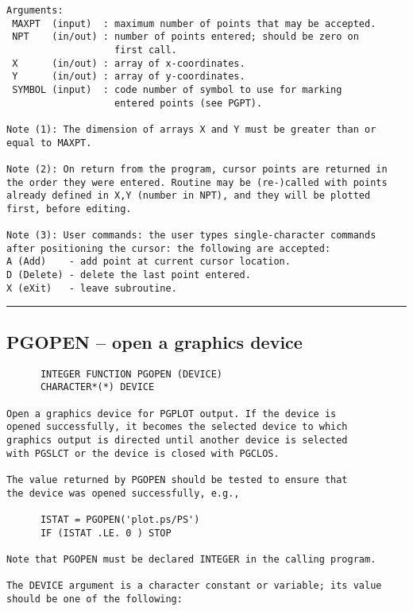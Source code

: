 {\begin{verbatim}
Arguments:
 MAXPT  (input)  : maximum number of points that may be accepted.
 NPT    (in/out) : number of points entered; should be zero on
                   first call.
 X      (in/out) : array of x-coordinates.
 Y      (in/out) : array of y-coordinates.
 SYMBOL (input)  : code number of symbol to use for marking
                   entered points (see PGPT).

Note (1): The dimension of arrays X and Y must be greater than or
equal to MAXPT.

Note (2): On return from the program, cursor points are returned in
the order they were entered. Routine may be (re-)called with points
already defined in X,Y (number in NPT), and they will be plotted
first, before editing.

Note (3): User commands: the user types single-character commands
after positioning the cursor: the following are accepted:
A (Add)    - add point at current cursor location.
D (Delete) - delete the last point entered.
X (eXit)   - leave subroutine.
\end{verbatim}
\hrule


\subsection*{PGOPEN -- open a graphics device }
\begin{verbatim}
      INTEGER FUNCTION PGOPEN (DEVICE)
      CHARACTER*(*) DEVICE

Open a graphics device for PGPLOT output. If the device is
opened successfully, it becomes the selected device to which
graphics output is directed until another device is selected
with PGSLCT or the device is closed with PGCLOS.

The value returned by PGOPEN should be tested to ensure that
the device was opened successfully, e.g.,

      ISTAT = PGOPEN('plot.ps/PS')
      IF (ISTAT .LE. 0 ) STOP

Note that PGOPEN must be declared INTEGER in the calling program.

The DEVICE argument is a character constant or variable; its value
should be one of the following:


\end{verbatim}}
